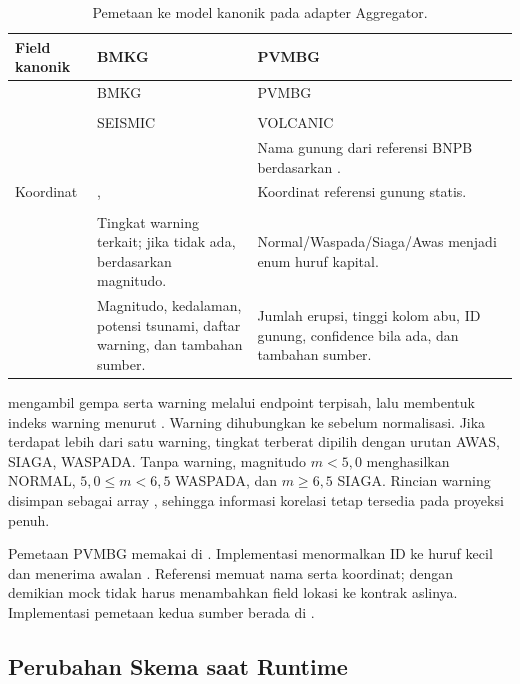 \begin{table}[H]\small
\begin{tabularx}{\textwidth}{@{}P{2.5cm}YY@{}}
\toprule \textbf{Field kanonik} & \textbf{BMKG} & \textbf{PVMBG}\\\midrule
{} & BMKG & PVMBG\\
 &  & \\
 & SEISMIC & VOLCANIC\\
 &  & Nama gunung dari referensi BNPB berdasarkan .\\
Koordinat & ,  & Koordinat referensi gunung statis.\\
 &  & \\
 & Tingkat warning terkait; jika tidak ada, berdasarkan magnitudo. & Normal/Waspada/Siaga/Awas menjadi enum huruf kapital.\\
 & Magnitudo, kedalaman, potensi tsunami, daftar warning, dan tambahan sumber. & Jumlah erupsi, tinggi kolom abu, ID gunung, confidence bila ada, dan tambahan sumber.\\\bottomrule
\end{tabularx}
\caption{Pemetaan ke model kanonik pada adapter Aggregator.}
\end{table}

 mengambil gempa serta warning melalui endpoint terpisah, lalu membentuk indeks warning menurut . Warning dihubungkan ke  sebelum normalisasi. Jika terdapat lebih dari satu warning, tingkat terberat dipilih dengan urutan AWAS, SIAGA, WASPADA. Tanpa warning, magnitudo $m<5{,}0$ menghasilkan NORMAL, $5{,}0\leq m<6{,}5$ WASPADA, dan $m\geq6{,}5$ SIAGA. Rincian warning disimpan sebagai array , sehingga informasi korelasi tetap tersedia pada proyeksi penuh.

Pemetaan PVMBG memakai  di . Implementasi menormalkan ID ke huruf kecil dan menerima awalan . Referensi memuat nama serta koordinat; dengan demikian mock tidak harus menambahkan field lokasi ke kontrak aslinya. Implementasi pemetaan kedua sumber berada di .

\subsection{Perubahan Skema saat Runtime}
